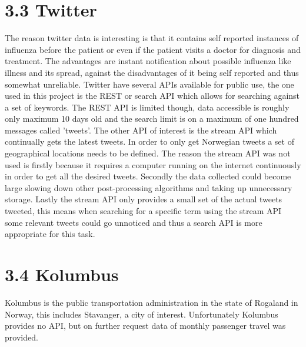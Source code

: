 \section*{3.3 Twitter}
The reason twitter data is interesting is that it contains self reported instances of influenza before the patient or even if the patient visits a doctor for diagnosis and treatment. The advantages are instant notification about possible influenza like illness and its spread, against the disadvantages of it being self reported and thus somewhat unreliable. Twitter have several APIs available for public use, the one used in this project is the REST or search API which allows for searching against a set of keywords. The REST API is limited though, data accessible is roughly only maximum 10 days old and the search limit is on a maximum of one hundred messages called 'tweets'. The other API of interest is the stream API which continually gets the latest tweets. In order to only get Norwegian tweets a set of geographical locations needs to be defined. The reason the stream API was not used is firstly because it requires a computer running on the internet continuously in order to get all the desired tweets. Secondly the data collected could become large slowing down other post-processing algorithms and taking up unnecessary storage. Lastly the stream API only provides a small set of the actual tweets tweeted, this means when searching for a specific term using the stream API some relevant tweets could go unnoticed and thus a search API is more appropriate for this task.

\section*{3.4 Kolumbus}
Kolumbus is the public transportation administration in the state of Rogaland in Norway, this includes Stavanger, a city of interest. Unfortunately Kolumbus provides no API, but on further request data of monthly passenger travel was provided.
